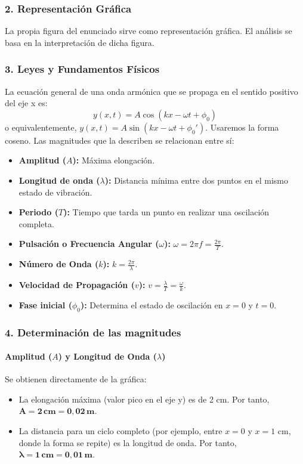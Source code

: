 \subsubsection*{2. Representación Gráfica}
La propia figura del enunciado sirve como representación gráfica. El análisis se basa en la interpretación de dicha figura.

\subsubsection*{3. Leyes y Fundamentos Físicos}
La ecuación general de una onda armónica que se propaga en el sentido positivo del eje x es:
$$ y(x,t) = A \cos(kx - \omega t + \phi_0) $$
o equivalentemente, $y(x,t) = A \sin(kx - \omega t + \phi_0')$. Usaremos la forma coseno.
Las magnitudes que la describen se relacionan entre sí:
\begin{itemize}
    \item \textbf{Amplitud ($A$):} Máxima elongación.
    \item \textbf{Longitud de onda ($\lambda$):} Distancia mínima entre dos puntos en el mismo estado de vibración.
    \item \textbf{Periodo ($T$):} Tiempo que tarda un punto en realizar una oscilación completa.
    \item \textbf{Pulsación o Frecuencia Angular ($\omega$):} $\omega = 2\pi f = \frac{2\pi}{T}$.
    \item \textbf{Número de Onda ($k$):} $k = \frac{2\pi}{\lambda}$.
    \item \textbf{Velocidad de Propagación ($v$):} $v = \frac{\lambda}{T} = \frac{\omega}{k}$.
    \item \textbf{Fase inicial ($\phi_0$):} Determina el estado de oscilación en $x=0$ y $t=0$.
\end{itemize}

\subsubsection*{4. Determinación de las magnitudes}
\paragraph*{Amplitud ($A$) y Longitud de Onda ($\lambda$)}
Se obtienen directamente de la gráfica:
\begin{itemize}
    \item La elongación máxima (valor pico en el eje y) es de 2 cm. Por tanto, $\boldsymbol{A = 2 \, \text{cm} = 0,02 \, \text{m}}$.
    \item La distancia para un ciclo completo (por ejemplo, entre $x=0$ y $x=1$ cm, donde la forma se repite) es la longitud de onda. Por tanto, $\boldsymbol{\lambda = 1 \, \text{cm} = 0,01 \, \text{m}}$.
\end{itemize}

